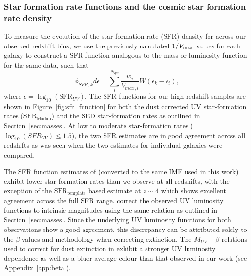 \subsubsection{Star formation rate functions and the cosmic star formation rate density}
To measure the evolution of the star-formation rate (SFR) density for across our observed redshift bins, we use the previously calculated $1/V_{\rm{max}}$ values for each galaxy to construct a SFR function analogous to the mass or luminosity function for the same data, such that
\begin{equation}\label{eq:vmaxmethod_sfr}
\phi_{SFR,k}d\epsilon = \sum_{i}^{N_{gal}} \frac{w_{i}}{V_{max,i}}W(\epsilon_{k}-\epsilon_{i}),
\end{equation}
where $\epsilon = \log_{10}(\text{SFR}_{UV})$. The SFR functions for our high-redshift samples are shown in Figure~\ref{fig:sfr_function} for both the dust corrected UV star-formation rates ($\text{SFR}_{\text{Madau}}$) and the SED star-formation rates as outlined in Section~\ref{sec:masses}. At low to moderate star-formation rates ($\log_{10}(SFR_{UV}) \leq 1.5$), the two SFR estimates are in good agreement across all redshifts as was seen when the two estimates for individual galaxies were compared. 

The SFR function estimates of \citet{Smit:2012is} (converted to the same IMF used in this work) exhibit lower star-formation rates than we observe at all redshifts, with the exception of the $\text{SFR}_{\text{template}}$ based estimate at $z\sim4$ which shows excellent agreement across the full SFR range. \citet{Smit:2012is} correct the observed UV luminosity functions \citep{2007ApJ...670..928B,Anonymous:96uKWdy6} to intrinsic magnitudes using the same \citet{Meurer:1999jm} relation as outlined in Section~\ref{sec:masses}. Since the underlying UV luminosity functions for both observations show a good agreement, this discrepancy can be attributed solely to the $\beta$ values and methodology when correcting extinction. The \citet{2012ApJ...754...83B} $M_{UV}-\beta$ relations used to correct for dust extinction in \citet{Smit:2012is} exhibit a stronger UV luminosity dependence as well as a bluer average colour than that observed in our work (see Appendix~\ref{app:beta}). 


